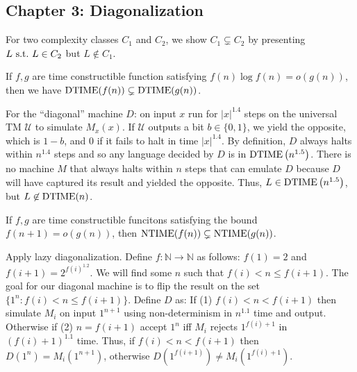 \subsection*{Chapter 3: Diagonalization}
\begin{note}
  For two complexity classes $C_1$ and $C_2$, we show
  $C_1 \subsetneq C_2$ by presenting $L \mathrm{\ s.t.\ } L \in C_2$ but $L \not\in C_1$.
\end{note}

\begin{note}
  If $f, g$ are time constructible function satisfying
  $f(n) \log f(n) = o (g(n))$, then we have
  $\mathrm{DTIME}(f(n)) \subsetneq \mathrm{DTIME}(g(n))$.
\end{note}

\begin{note}
  For the ``diagonal'' machine $D$:
  on input $x$ run for $|x|^{1.4}$ steps on the universal TM $\mathcal{U}$
  to simulate $M_x (x)$.
  If $\mathcal{U}$ outputs a bit $b \in \{0, 1\}$, we yield the opposite,
  which is $1 - b$, and $0$ if it fails to halt in time $|x|^{1.4}$.
  By definition, $D$ always halts within $n^{1.4}$ steps and so any language
  decided by $D$ is in $\mathrm{DTIME}\left(n^{1.5}\right)$.
  There is no machine $M$ that always halts within $n$ steps that can emulate
  $D$ because $D$ will have captured its result and yielded the opposite.
  Thus, $L \in \mathrm{DTIME}\left(n^{1.5}\right)$, but $L \not\in \mathrm{DTIME}(n)$.
\end{note}

\begin{note}
  If $f, g$ are time constructible funcitons satisfying the bound
  $f(n + 1) = o(g(n))$,
  then $\mathrm{NTIME}(f(n)) \subsetneq \mathrm{NTIME}(g(n))$.
\end{note}

\begin{note}
Apply lazy diagonalization.
Define $f : \mathbb{N} \to \mathbb{N}$ as follows: $f(1) = 2$
and $f(i + 1) = 2^{f(i)^{1.2}}$.
We will find some $n$ such that $f(i) < n \leq f(i + 1)$.
The goal for our diagonal machine is to flip the result on the
set $\{ 1^n : f(i) < n \leq f(i + 1)\}$.
Define $D$ as:
If (1) $f(i) < n < f(i + 1)$ then simulate $M_i$ on input $1 ^{n + 1}$ using
non-determinism in $n^{1.1}$ time and output.
Otherwise if (2) $n = f(i + 1)$ accept $1^n$ iff $M_i$ rejects
$1^{f(i) + 1}$ in $(f(i) + 1)^{1.1}$ time.
Thus, if $f(i) < n < f(i + 1)$ then
$D\left(1^n\right) = M_i \left(1^{n + 1}\right)$, otherwise
$D\left(1^{f(i + 1)}\right) \neq M_i \left(1^{f(i) + 1}\right)$.
\end{note}

